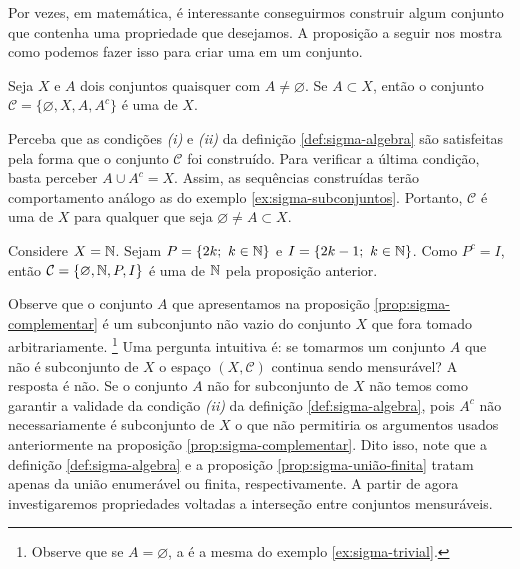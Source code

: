 Por vezes, em matemática, é interessante  conseguirmos construir algum conjunto que contenha uma propriedade que desejamos. 
A proposição a seguir nos mostra como podemos fazer isso para criar uma \sigal em um conjunto.


\begin{proposition}
\label{prop:sigma-complementar}
    Seja $X$ e $A$ dois conjuntos quaisquer com $A \neq \varnothing$.
    Se $A \subset X$, então o conjunto 
    $\mathcal{C}=\{\varnothing, X, A, A^c\}$ é uma \sigal de $X$.
\end{proposition}

\begin{prova}
    Perceba que as condições \textit{(i)} e \textit{(ii)} da definição \ref{def:sigma-algebra} são satisfeitas pela forma que o conjunto  $\mathcal{C}$ foi construído. Para verificar a última condição, basta perceber $A \cup A^c = X$. Assim, as sequências construídas terão comportamento análogo as do exemplo \ref{ex:sigma-subconjuntos}. Portanto, $\mathcal{C}$ é uma \sigal de $X$ para qualquer que seja $ \varnothing \neq A \subset X$.
\end{prova}

\begin{example}
    Considere $X = \operatorname{\mathbb{N}}$. 
    Sejam $P =\{2k; \ k \in \operatorname{\mathbb{N}}\}$ e $I = \{2k - 1;\ k \in \operatorname{\mathbb{N}}\}$. 
    Como $P^c = I$, então $\mathcal{C} = \{\varnothing, \operatorname{\mathbb{N}}, P, I\}$ é uma \sigal de $\operatorname{\mathbb{N}}$ pela proposição anterior.
\end{example}

Observe que o conjunto $A$ que apresentamos na proposição \ref{prop:sigma-complementar} é um subconjunto não vazio do conjunto $X$ que fora tomado arbitrariamente. 
\footnote{Observe que se $A = \varnothing$, a \sigal é a mesma do exemplo \ref{ex:sigma-trivial}.}
Uma pergunta intuitiva é: se tomarmos um conjunto $A$ que não é subconjunto de $X$ o espaço $(X, \mathcal{C})$ continua sendo mensurável? A resposta é não.
Se o conjunto $A$ não for subconjunto de $X$ não temos como garantir a validade da condição \textit{(ii)}  da definição \ref{def:sigma-algebra}, pois  $A^c$ não necessariamente é subconjunto de $X$ o que não permitiria os argumentos usados anteriormente na proposição \ref{prop:sigma-complementar}. 
Dito isso, note que a definição \ref{def:sigma-algebra} e a proposição \ref{prop:sigma-união-finita} tratam apenas da união enumerável ou finita, respectivamente. A partir de agora investigaremos propriedades voltadas a interseção entre conjuntos mensuráveis.

